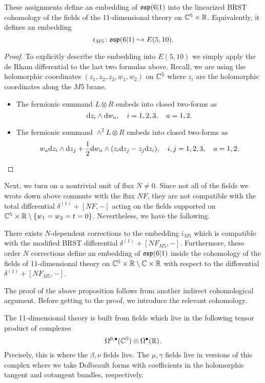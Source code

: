 \begin{lem}
These assignments define an embedding of $\mathfrak{osp}(6|1)$ into the linearized BRST cohomology of the fields of the 11-dimensional theory on $\mathbb C^5 \times \mathbb R$. 
Equivalently, it defines an embedding
\[
i_{M5} \colon \mathfrak{osp}(6|1) \hookrightarrow E(5,10) .
\]
\end{lem} 

\begin{proof}
To explicitly describe the embedding into $E(5,10)$ we simply apply the de Rham differential to the last two formulas above.
Recall, we are using the holomorphic coordinates $(z_1,z_2,z_3, w_1,w_2)$ on $\mathbb C^5$ where $z_i$ are the holomorphic coordinates along the $M5$ brane. 
\begin{itemize}
\item 
The fermionic summand $L \otimes R$ embeds into closed two-forms as
\[
{\rm d} z_i \wedge {\rm d} w_a, \quad i=1,2,3, \quad a=1,2. 
\] 
\item 
The fermionic summand $\wedge^2 L \otimes R$ embeds into closed two-forms as
\[
w_a {\rm d} z_i  \wedge {\rm d} z_j + \frac12 {\rm d} w_a \wedge (z_i {\rm d} z_j - z_j {\rm d} z_i) , \quad i,j=1,2,3, \quad a=1,2. 
\] 
\end{itemize}
\end{proof}
\parsec[]

Next, we turn on a nontrivial unit of flux $N \ne 0$. 
Since not all of the fields we wrote down above commute with the flux $N F$, they are not compatible with the total differential $\delta^{(1)} + [N F, -]$ acting on the fields supported on $\mathbb C^5 \times \mathbb R \setminus \{w_1=w_2=t=0\}$. 
Nevertheless, we have the following.

\begin{prop}
\label{prop:brads7}
There exists $N$-dependent corrections to the embedding $i_{M5}$ which is compatible with the modified BRST differential $\delta^{(1)} + [N F_{M5},-]$. 
Furthermore, these order $N$ corrections define an embedding of $\mathfrak{osp}(6|1)$ inside the cohomology of the fields of 11-dimensional theory on $\mathbb C^5 \times \mathbb R \setminus \mathbb C \times \mathbb R$ with respect to the differential $\delta^{(1)} + [N  F_{M5},-]$.
\end{prop}

\parsec[s:thfcohomology]

The proof of the above proposition follows from another indirect cohomological argument. 
Before getting to the proof, we introduce the relevant cohomology. 

The 11-dimensional theory is built from fields which live in the following tensor product of complexes 
\[
\Omega^{0,\bullet}(\mathbb C^5) \otimes \Omega^\bullet(\mathbb R).
\]
Precisely, this is where the $\beta,\nu$ fields live. 
The $\mu,\gamma$ fields live in versions of this complex where we take Dolbeault forms with coefficients in the holomorphic tangent and cotangent bundles, respectively. 

